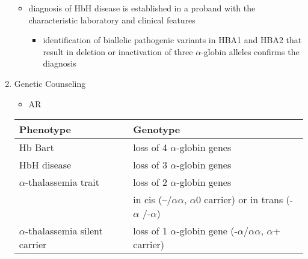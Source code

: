 \documentclass[12pt]{scrartcl}
\begin{document}
\begin{enumerate}
\begin{itemize}
\begin{itemize}
\end{itemize}
\item diagnosis of HbH disease is established in a proband with the
characteristic laboratory and clinical features
\begin{itemize}
\item identification of biallelic pathogenic variants in HBA1 and HBA2
that result in deletion or inactivation of three \(\alpha\)-globin
alleles confirms the diagnosis
\end{itemize}
\end{itemize}
\item Genetic Counseling
\label{sec:orgbf6d418}
\begin{itemize}
\item AR
\end{itemize}

\begin{center}
\begin{tabular}{ll}
Phenotype & Genotype\\
\hline
Hb Bart & loss of 4 \(\alpha\)-globin genes\\
HbH disease & loss of 3 \(\alpha\)-globin genes\\
\(\alpha\)-thalassemia trait & loss of 2 \(\alpha\)-globin genes\\
 & in cis (--/\(\alpha \alpha\), \(\alpha\)0 carrier) or in trans (-\(\alpha\) /-\(\alpha\))\\
\(\alpha\)-thalassemia silent carrier & loss of 1 \(\alpha\)-globin gene (-\(\alpha\)/\(\alpha \alpha\), \(\alpha\)+ carrier)\\
\end{tabular}
\end{center}
\end{enumerate}
\end{document}
